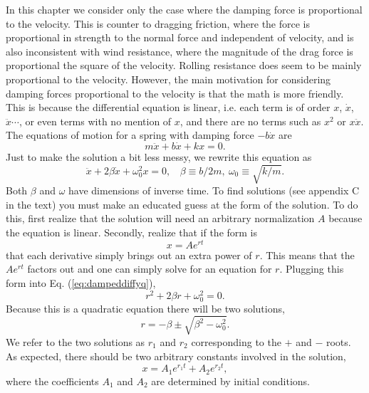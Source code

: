 In this chapter we consider only the case where the damping force is proportional to the velocity. This is counter to dragging friction, where the force is proportional in strength to the normal force and independent of velocity, and is also inconsistent with wind resistance, where the magnitude of the drag force is proportional the square of the velocity. Rolling resistance does seem to be mainly proportional to the velocity. However, the main motivation for considering damping forces proportional to the velocity is that the math is more friendly. This is because the differential equation is linear, i.e. each term is of order $x$, $\dot{x}$, $\ddot{x}\cdots$, or even terms with no mention of $x$, and there are no terms such as $x^2$ or $x\ddot{x}$. The equations of motion for a spring with damping force $-b\dot{x}$ are
\begin{equation}
m\ddot{x}+b\dot{x}+kx=0.
\end{equation}
Just to make the solution a bit less messy, we rewrite this equation as
\begin{equation}
\label{eq:dampeddiffyq}
\ddot{x}+2\beta\dot{x}+\omega_0^2x=0,~~~~\beta\equiv b/2m,~\omega_0\equiv\sqrt{k/m}.
\end{equation}
Both $\beta$ and $\omega$ have dimensions of inverse time. To find solutions (see appendix C in the text) you must make an educated guess at the form of the solution. To do this, first realize that the solution will need an arbitrary normalization $A$ because the equation is linear. Secondly, realize that if the form is
\begin{equation}
x=Ae^{rt}
\end{equation}
that each derivative simply brings out an extra power of $r$. This means that the $Ae^{rt}$ factors out and one can simply solve for an equation for $r$. Plugging this form into Eq. (\ref{eq:dampeddiffyq}),
\begin{equation}
r^2+2\beta r+\omega_0^2=0.
\end{equation}
Because this is a quadratic equation there will be two solutions,
\begin{equation}
r=-\beta\pm\sqrt{\beta^2-\omega_0^2}.
\end{equation}
We refer to the two solutions as $r_1$ and $r_2$ corresponding to the $+$ and $-$ roots. As expected, there should be two arbitrary constants involved in the solution,
\begin{equation}
x=A_1e^{r_1t}+A_2e^{r_2t},
\end{equation}
where the coefficients $A_1$ and $A_2$ are determined by initial conditions.

